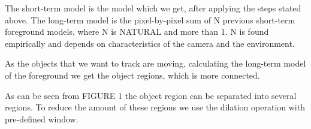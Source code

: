 \documentclass[12pt,a4paper,oneside,titlepage]{article}
\begin{document}







The short-term model is the model which we get, after applying the steps stated above.
The long-term model is the pixel-by-pixel sum of N previous short-term foreground models, where N is NATURAL and more than 1.  
N is found empirically and depends on characteristics of the camera and the environment.

As the objects that we want to track are moving, calculating the long-term model of  the foreground we get the object regions, which is more connected.

As can be seen from FIGURE 1 the object region can be separated into several regions.
To reduce the amount of these regions we use the dilation operation with pre-defined window.
\end{document}
